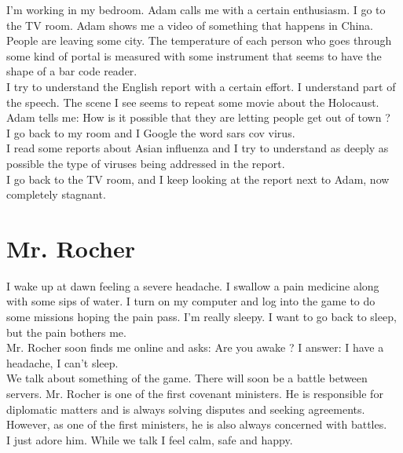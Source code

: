 \documentclass[11pt]{book}
\begin{document}
\noindent I'm working in my bedroom. Adam calls me with a certain enthusiasm. I go to the TV room. Adam shows me a video of something that happens in China. People are leaving some city. The temperature of each person who goes through some kind of portal is measured with some instrument that seems to have the shape of a bar code reader. \\

\noindent I try to understand the English report with a certain effort. I understand part of the speech. The scene I see seems to repeat some movie about the Holocaust. \\

\noindent Adam tells me: How is it possible that they are letting people get out of town ? \\

\noindent I go back to my room and I Google the word sars cov virus. \\

\noindent I read some reports about Asian influenza and I try to understand as deeply as possible the type of viruses being addressed in the report. \\

\noindent I go back to the TV room, and I keep looking at the report next to Adam, now completely stagnant.

\chapter{Mr. Rocher}

\noindent I wake up at dawn feeling a severe headache. I swallow a pain medicine along with some sips of water. I turn on my computer and log into the game to do some missions hoping the pain pass. I'm really sleepy. I want to go back to sleep, but the pain bothers me. \\

\noindent Mr. Rocher soon finds me online and asks: Are you awake ? I answer: I have a headache, I can't sleep. \\

\noindent We talk about something of the game. There will soon be a battle between servers. Mr. Rocher is one of the first covenant ministers. He is responsible for diplomatic matters and is always solving disputes and seeking agreements. However, as one of the first ministers, he is also always concerned with battles. \\

\noindent I just adore him. While we talk I feel calm, safe and happy. \\
\end{document}

